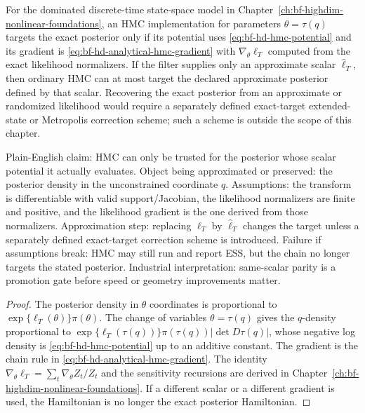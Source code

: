 \begin{proposition}
\label{prop:bf-hd-hmc-gradient-contract}
For the dominated discrete-time state-space model in
Chapter~\ref{ch:bf-highdim-nonlinear-foundations}, an HMC implementation for
parameters \(\theta=\tau(q)\) targets the exact posterior only if its potential
uses \eqref{eq:bf-hd-hmc-potential} and its gradient is
\eqref{eq:bf-hd-analytical-hmc-gradient} with
\(\nabla_\theta\ell_T\) computed from the exact likelihood normalizers.
If the filter supplies only an approximate scalar \(\widehat\ell_T\), then
ordinary HMC can at most target the declared approximate posterior defined by
that scalar.  Recovering the exact posterior from an approximate or randomized
likelihood would require a separately defined exact-target extended-state or
Metropolis correction scheme; such a scheme is outside the scope of this
chapter.
\end{proposition}

Plain-English claim: HMC can only be trusted for the posterior whose scalar
potential it actually evaluates.  Object being approximated or preserved:
the posterior density in the unconstrained coordinate \(q\).  Assumptions:
the transform is differentiable with valid support/Jacobian, the likelihood
normalizers are finite and positive, and the likelihood gradient is the one
derived from those normalizers.  Approximation step: replacing
\(\ell_T\) by \(\widehat\ell_T\) changes the target unless a separately defined
exact-target correction scheme is introduced.  Failure if assumptions break: HMC
may still run and report ESS, but the chain no longer targets the stated
posterior.  Industrial interpretation: same-scalar parity is a promotion gate
before speed or geometry improvements matter.

\begin{proof}
The posterior density in \(\theta\) coordinates is proportional to
\(\exp\{\ell_T(\theta)\}\pi(\theta)\).  The change of variables
\(\theta=\tau(q)\) gives the \(q\)-density proportional to
\(\exp\{\ell_T(\tau(q))\}\pi(\tau(q))|\det D\tau(q)|\), whose negative log
density is \eqref{eq:bf-hd-hmc-potential} up to an additive constant.  The
gradient is the chain rule in \eqref{eq:bf-hd-analytical-hmc-gradient}.  The
identity \(\nabla_\theta\ell_T=\sum_t\nabla_\theta Z_t/Z_t\) and the
sensitivity recursions are derived in
Chapter~\ref{ch:bf-highdim-nonlinear-foundations}.  If a different scalar or a
different gradient is used, the Hamiltonian is no longer the exact posterior
Hamiltonian.
\end{proof}

